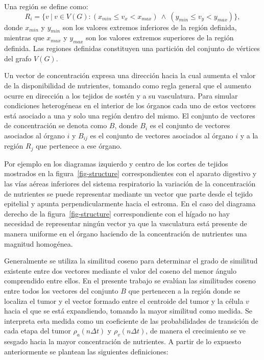 \begin{definition}
\label{def-regions}
Una regi\'on se define como:
\begin{equation}
R_i = \lbrace v~|~v \in V(G) : (x_{min} \leq v_x < x_{max})~\wedge~(y_{min} \leq v_y < y_{max}) \rbrace,
\end{equation}
donde $x_{min}$ y $y_{min}$ son los valores extremos inferiores de la regi\'on definida, mientras que $x_{max}$ y $y_{max}$ son los valores extremos superiores de la regi\'on definida. Las regiones definidas constituyen una partici\'on del conjunto de v\'ertices del grafo $V(G)$.
\end{definition}

\begin{definition}
\label{def-concentration}
Un vector de concentraci\'on expresa una direcci\'on hacia la cual aumenta el valor de la disponibilidad de nutrientes, tomando como regla general que el aumento ocurre en direcci\'on a los tejidos de sost\'en y a su vasculatura. Para simular condiciones heterog\'eneas en el interior de los \'organos cada uno de estos vectores est\'a asociado a una y solo una regi\'on dentro del mismo. El conjunto de vectores de concentraci\'on se denota como $B$, donde $B_i$ es el conjunto de vectores asociados al \'organo $i$ y $B_{ij}$ es el conjunto de vectores asociados al \'organo $i$ y a la regi\'on $R_j$ que pertenece a ese \'organo. 
\end{definition}

Por ejemplo en los diagramas izquierdo y centro de los cortes de tejidos mostrados en la figura~\ref{fig-structure} correspondientes con el aparato digestivo y las v\'ias a\'ereas inferiores del sistema respiratorio la variaci\'on de la concentraci\'on de nutrientes se puede representar mediante un vector que parte desde el tejido epitelial y apunta perpendicularmente hacia el estroma. En el caso del diagrama derecho de la figura~\ref{fig-structure} correspondiente con el h\'igado no hay necesidad de representar ning\'un vector ya que la vasculatura est\'a presente de manera uniforme en el \'organo haciendo de la concentraci\'on de nutrientes una magnitud homog\'enea. 

Generalmente se utiliza la similitud coseno para determinar el grado de similitud existente entre dos vectores mediante el valor del coseno del menor \'angulo comprendido entre ellos. En el presente trabajo se eval\'uan las similitudes coseno entre todos los vectores del conjunto $B$ que pertenecen a la regi\'on donde se localiza el tumor y el vector formado entre el centroide del tumor y la c\'elula $v$ hacia el que se est\'a expandiendo, tomando la mayor similitud como medida. Se interpreta esta medida como un coeficiente de las probabilidades de transici\'on de cada etapa del tumor $\rho_a(n \Delta t)$ y $\rho_v(n \Delta t)$, de manera el crecimiento se ve sesgado hacia la mayor concentraci\'on de nutrientes. A partir de lo expuesto anteriormente se plantean las siguientes definiciones:

